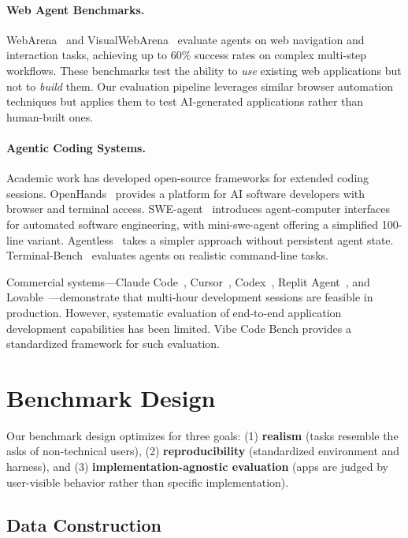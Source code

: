\paragraph{Web Agent Benchmarks.}
WebArena~\cite{zhou2024webarena} and VisualWebArena~\cite{koh2024visualwebarena} evaluate agents on web navigation and interaction tasks, achieving up to 60\% success rates on complex multi-step workflows. These benchmarks test the ability to \emph{use} existing web applications but not to \emph{build} them. Our evaluation pipeline leverages similar browser automation techniques but applies them to test AI-generated applications rather than human-built ones.

\paragraph{Agentic Coding Systems.}
Academic work has developed open-source frameworks for extended coding sessions. OpenHands~\cite{wang2024openhands} provides a platform for AI software developers with browser and terminal access. SWE-agent~\cite{yang2024sweagent} introduces agent-computer interfaces for automated software engineering, with mini-swe-agent offering a simplified 100-line variant. Agentless~\cite{xia2024agentless} takes a simpler approach without persistent agent state. Terminal-Bench~\cite{merrill2025terminalbench} evaluates agents on realistic command-line tasks.

Commercial systems---Claude Code~\cite{anthropic2024claudecode}, Cursor~\cite{cursor2024}, Codex~\cite{openai2025codex}, Replit Agent~\cite{replit2025agent}, and Lovable~\cite{lovable2025}---demonstrate that multi-hour development sessions are feasible in production. However, systematic evaluation of end-to-end application development capabilities has been limited. Vibe Code Bench provides a standardized framework for such evaluation.

\section{Benchmark Design}

Our benchmark design optimizes for three goals: (1) \textbf{realism} (tasks resemble the asks of non-technical users), (2) \textbf{reproducibility} (standardized environment and harness), and (3) \textbf{implementation-agnostic evaluation} (apps are judged by user-visible behavior rather than specific implementation).

\subsection{Data Construction}
\label{sec:data-construction}

